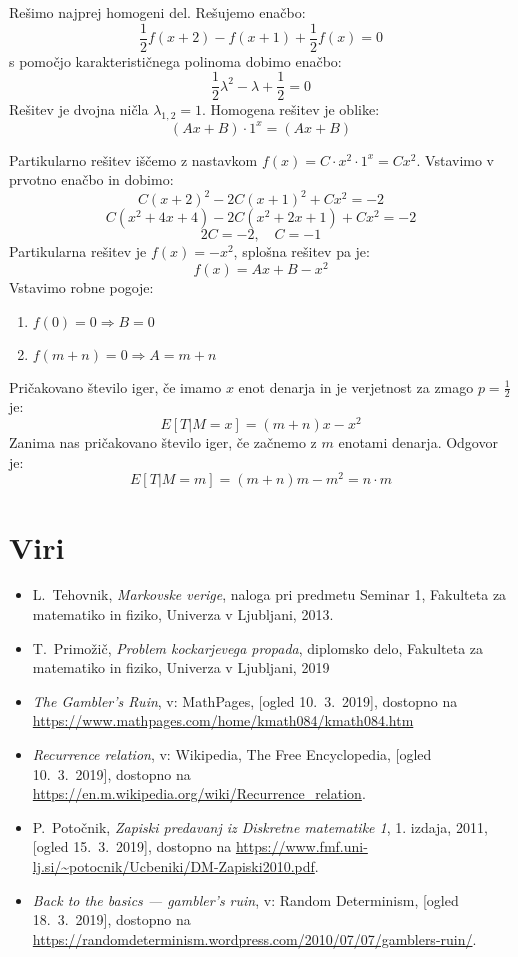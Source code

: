 \documentclass[12pt, a4paper]{article}
\begin{document}
Rešimo najprej homogeni del. Rešujemo enačbo: $$\frac{1}{2}f(x+2)-f(x+1)+\frac{1}{2}f(x)=0$$ s pomočjo karakterističnega polinoma dobimo enačbo: $$\frac{1}{2}\lambda^2-\lambda+\frac{1}{2}=0$$ Rešitev je dvojna ničla $\lambda_{1, 2}= 1$. Homogena rešitev je oblike: $$(Ax+B)\cdot 1^x=(Ax+B)$$

Partikularno rešitev iščemo z nastavkom $f(x)=C\cdot x^2\cdot 1^x= Cx^2$. Vstavimo v prvotno enačbo in dobimo:
$$C(x+2)^2-2C(x+1)^2+Cx^2=-2$$
$$C(x^2+4x+4)-2C(x^2+2x+1)+Cx^2=-2$$
$$2C=-2, \quad C = -1 $$ Partikularna rešitev je $f(x)=-x^2$, splošna rešitev pa je: $$f(x)=Ax+B-x^2$$
Vstavimo robne pogoje:
\begin{enumerate}
\item $f(0)=0\Rightarrow B = 0$
\item $f(m+n)=0 \Rightarrow A = m+n$
\end{enumerate}
Pričakovano število iger, če imamo $x$ enot denarja in je verjetnost za zmago $p=\frac{1}{2}$ je: $$E[T|M=x]= (m+n)x-x^2$$
Zanima nas pričakovano število iger, če začnemo z $m$ enotami denarja. Odgovor je:$$E[T|M=m]=(m+n)m-m^2= n\cdot m$$

\section[Viri]{Viri}
\begin{itemize}
\item L.~Tehovnik, \emph{Markovske verige}, naloga pri predmetu Seminar 1, Fakulteta za matematiko in fiziko, Univerza v Ljubljani, 2013.
\item T.~Primožič, \emph{Problem kockarjevega propada}, diplomsko delo, Fakulteta za matematiko in fiziko, Univerza v Ljubljani, 2019
\item \emph{The Gambler's Ruin}, v: MathPages, [ogled 10.~3.~2019], dostopno na \url{https://www.mathpages.com/home/kmath084/kmath084.htm}
\item \emph{Recurrence relation}, v: Wikipedia, The Free Encyclopedia, [ogled 10.~3.~2019], dostopno na \url{https://en.m.wikipedia.org/wiki/Recurrence_relation}.
\item P.~Potočnik, \emph{Zapiski predavanj iz Diskretne matematike 1}, 1. izdaja, 2011, [ogled 15.~3.~2019], dostopno na \url{https://www.fmf.uni-lj.si/~potocnik/Ucbeniki/DM-Zapiski2010.pdf}.
\item \emph{Back to the basics — gambler’s ruin}, v: Random Determinism, [ogled 18.~3.~2019], dostopno na \url{https://randomdeterminism.wordpress.com/2010/07/07/gamblers-ruin/}.
\end{itemize}
\end{document}
